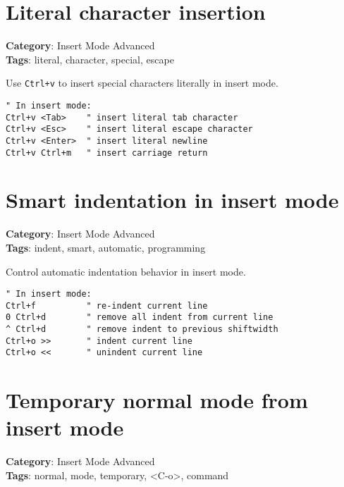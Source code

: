 {{{{{{\section{Literal character insertion}

\textbf{Category}: Insert Mode Advanced\\ \textbf{Tags}: literal, character, special, escape
\vspace{0.5cm}

Use {\footnotesize \Verb§Ctrl+v§} to insert special characters literally in insert mode.

\begin{Exa*}{}
\begin{Verbatim}[fontsize=\footnotesize, breaklines, breakanywhere]
" In insert mode:
Ctrl+v <Tab>    " insert literal tab character
Ctrl+v <Esc>    " insert literal escape character
Ctrl+v <Enter>  " insert literal newline
Ctrl+v Ctrl+m   " insert carriage return
\end{Verbatim}
\end{Exa*}

\section{Smart indentation in insert mode}

\textbf{Category}: Insert Mode Advanced\\ \textbf{Tags}: indent, smart, automatic, programming
\vspace{0.5cm}

Control automatic indentation behavior in insert mode.

\begin{Exa*}{}
\begin{Verbatim}[fontsize=\footnotesize, breaklines, breakanywhere]
" In insert mode:
Ctrl+f          " re-indent current line
0 Ctrl+d        " remove all indent from current line
^ Ctrl+d        " remove indent to previous shiftwidth
Ctrl+o >>       " indent current line
Ctrl+o <<       " unindent current line
\end{Verbatim}
\end{Exa*}

\section{Temporary normal mode from insert mode}

\textbf{Category}: Insert Mode Advanced\\ \textbf{Tags}: normal, mode, temporary, <C-o>, command
\vspace{0.5cm}

}}}}}}
